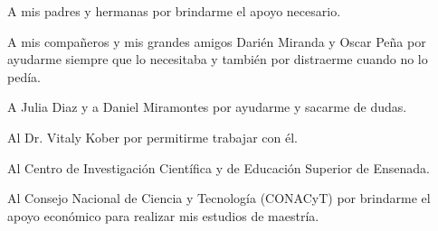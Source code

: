 
\hspace{12pt}
A mis padres y hermanas por brindarme el apoyo necesario. 

A mis compañeros y mis grandes amigos Darién Miranda y Oscar Peña por ayudarme siempre que lo necesitaba y también por distraerme cuando no lo pedía.  

A Julia Diaz y a Daniel Miramontes por ayudarme y sacarme de dudas. 
 
Al Dr. Vitaly Kober por permitirme trabajar con él. 
\bigskip

Al Centro de Investigación Científica y de Educación Superior de Ensenada.
\bigskip

Al Consejo Nacional de Ciencia y Tecnología (CONACyT) por brindarme el apoyo econ\'omico para realizar mis estudios de \newline maestría.
